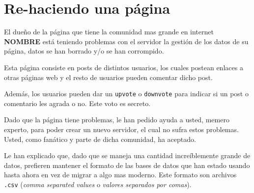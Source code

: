 \section{Re-haciendo una página}

El dueño de la página que tiene la comunidad mas grande en internet \textbf{NOMBRE} está teniendo problemas con el servidor la gestión de los datos de su página, datos se han borrado y/o se han corrompido. 

Esta página consiste en posts de distintos usuarios, los cuales postean enlaces a otras páginas web y el resto de usuarios pueden comentar dicho post.

Además, los usuarios pueden dar un \texttt{upvote} o \texttt{downvote} para indicar si un post o comentario les agrada o no. Este voto es secreto.

Dado que la página tiene problemas, le han pedido ayuda a usted, memero experto, para poder crear un nuevo servidor, el cual no sufra estos problemas. Usted, como fanático y parte de dicha comunidad, ha aceptado.

Le han explicado que, dado que se maneja una cantidad increíblemente grande de datos, prefieren mantener el formato de las bases de datos que han estado usando hasta ahora en vez de migrar a algo mas moderno. Este formato son archivos \texttt{.csv} (\textit{comma separated values} o \textit{valores separados por comas}).

